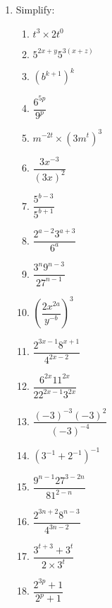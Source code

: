 \begin{eocexercises}{}
\begin{enumerate}[label=\textbf{\arabic*}., itemsep=5pt]
\item Simplify:
\begin{multicols}{2}
\begin{enumerate}[label=\textbf{(\alph*)}, itemsep=7pt]
\item $ t^3 \times 2t^0 $
\item $ 5^{2x+y} 5^{3(x+z)} $
\item $ (b^{k+1})^k $
\item $ \dfrac{6^{5p}}{9^p} $
\item $ m^{-2t} \times (3m^t)^3 $
\item $\dfrac{3{x}^{-3}}{{(3x)}^{2}}$
\item $\dfrac{{5}^{b-3}}{{5}^{b+1}}$
\item $\dfrac{{2}^{a-2} {3}^{a+3}}{{6}^{a}}$
\item $\dfrac{{3}^{n} {9}^{n-3}}{{27}^{n-1}}$
\item ${\left(\dfrac{2{x}^{2a}}{{y}^{-b}}\right)}^{3}$
\item $\dfrac{{2}^{3x-1} {8}^{x+1}}{{4}^{2x-2}}$
\item $\dfrac{{6}^{2x} {11}^{2x}}{{22}^{2x-1} {3}^{2x}}$
\item $\dfrac{{(-3)}^{-3} {(-3)}^{2}}{{(-3)}^{-4}}$
\item ${({3}^{-1}+{2}^{-1})}^{-1}$
\item $\dfrac{{9}^{n-1} {27}^{3-2n}}{{81}^{2-n}}$
\item $\dfrac{{2}^{3n+2} {8}^{n-3}}{{4}^{3n-2}}$
\item $\dfrac{3^{t+3} + 3^t}{2 \times 3^t} $
\item $\dfrac{2^{3p} +1}{2^p + 1} $
\end{enumerate}
\end{multicols}



\end{enumerate}
\end{eocexercises}
